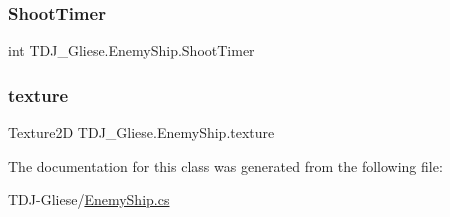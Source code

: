 \subsubsection{\texorpdfstring{Shoot\+Timer}{ShootTimer}}
{\footnotesize\ttfamily int T\+D\+J\+\_\+\+Gliese.\+Enemy\+Ship.\+Shoot\+Timer}

\mbox{\label{class_t_d_j___gliese_1_1_enemy_ship_abe9d9143fb6cae02801564abc684f0bd}} 
\subsubsection{\texorpdfstring{texture}{texture}}
{\footnotesize\ttfamily Texture2D T\+D\+J\+\_\+\+Gliese.\+Enemy\+Ship.\+texture}



The documentation for this class was generated from the following file\+:\begin{DoxyCompactItemize}
\item 
T\+D\+J-\/\+Gliese/\hyperlink{_enemy_ship_8cs}{Enemy\+Ship.\+cs}\end{DoxyCompactItemize}
